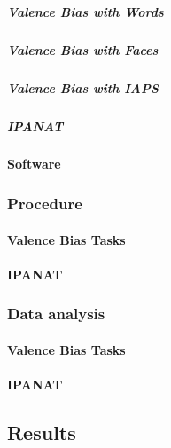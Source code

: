 \documentclass[man]{apa6}
\let\oldparagraph\paragraph
\renewcommand{\paragraph}[1]{\oldparagraph{#1}\mbox{}}
\let\oldsubparagraph\subparagraph
\renewcommand{\subparagraph}[1]{\oldsubparagraph{#1}\mbox{}}
\begin{document}
\hypertarget{valence-bias-with-words}{%
\subparagraph{Valence Bias with Words}\label{valence-bias-with-words}}

\hypertarget{valence-bias-with-faces}{%
\subparagraph{Valence Bias with Faces}\label{valence-bias-with-faces}}

\hypertarget{valence-bias-with-iaps}{%
\subparagraph{Valence Bias with IAPS}\label{valence-bias-with-iaps}}

\hypertarget{ipanat}{%
\subparagraph{IPANAT}\label{ipanat}}

\hypertarget{software-1}{%
\paragraph{Software}\label{software-1}}

\hypertarget{procedure-1}{%
\subsubsection{Procedure}\label{procedure-1}}

\hypertarget{valence-bias-tasks}{%
\paragraph{Valence Bias Tasks}\label{valence-bias-tasks}}

\hypertarget{ipanat-1}{%
\paragraph{IPANAT}\label{ipanat-1}}

\hypertarget{data-analysis-1}{%
\subsubsection{Data analysis}\label{data-analysis-1}}

\hypertarget{valence-bias-tasks-1}{%
\paragraph{Valence Bias Tasks}\label{valence-bias-tasks-1}}

\hypertarget{ipanat-2}{%
\paragraph{IPANAT}\label{ipanat-2}}

\hypertarget{results-1}{%
\subsection{Results}\label{results-1}}
\end{document}
